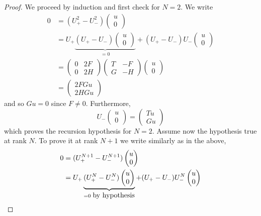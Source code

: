 \documentclass[12pt]{amsart}
\theoremstyle{definition}
\theoremstyle{remark}
\numberwithin{equation}{section}
\begin{document}
\begin{proof}
  We proceed by induction and first check for $N=2$. We write
  \[
    \begin{split}
      0&=(U_+^2-U_-^2)\begin{pmatrix}u\\0\end{pmatrix}\\
      &=U_+\underbrace{(U_+-U_-)\begin{pmatrix}u\\0\end{pmatrix}}_{=0}+(U_+-U_-)U_-\begin{pmatrix}u\\0\end{pmatrix}\\
      &=\begin{pmatrix}0&2F\\0&2H\end{pmatrix}\begin{pmatrix}T&-F\\G&-H\end{pmatrix}\begin{pmatrix}u\\0\end{pmatrix}\\
      &=\begin{pmatrix}2FGu\\ 2HGu\end{pmatrix}
          \end{split}
  \]
  and so $Gu=0$ since $F\not=0$. Furthermore,
  \[
U_-\begin{pmatrix}u\\0\end{pmatrix}=\begin{pmatrix}Tu\\ Gu\end{pmatrix}
\]
which proves the recursion hypothesis for $N=2$. Assume now the hypothesis true at rank $N$. To prove it at rank $N+1$ we write similarly as in the above,
\[
    \begin{split}
      0&=(U_+^{N+1}-U_-^{N+1})\begin{pmatrix}u\\0\end{pmatrix}\\
      &=U_+\underbrace{(U_+^N-U_-^N)\begin{pmatrix}u\\0\end{pmatrix}}_{=0 \,\,\mbox{\rm by hypothesis}}+(U_+-U_-)U_-^N\begin{pmatrix}u\\0\end{pmatrix}\\

\end{split}\]
\end{proof}
\end{document}
